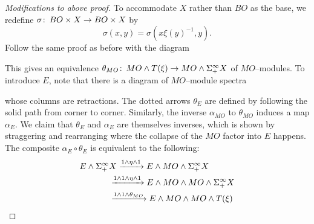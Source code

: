 \begin{proof}[Modifications to above proof]
To accommodate \(X\) rather than \(BO\) as the base, we redefine \(\sigma\colon\thinspace BO \times X \to BO \times X\) by \[\sigma(x, y) = \sigma(x \xi(y)^{-1}, y).\]  Follow the same proof as before with the diagram
\begin{center}
\end{center}
This gives an equivalence \(\theta_{MO}\colon\thinspace MO \wedge T(\xi) \rightarrow MO \wedge \Sigma^\infty_+ X\) of \(MO\)--modules.  To introduce \(E\), note that there is a diagram of \(MO\)--module spectra
\begin{center}
\end{center}
whose columns are retractions.  The dotted arrows \(\theta_E\) are defined by following the solid path from corner to corner.  Similarly, the inverse \(\alpha_{MO}\) to \(\theta_{MO}\) induces a map \(\alpha_E\).  We claim that \(\theta_E\) and \(\alpha_E\) are themselves inverses, which is shown by straggering and rearranging where the collapse of the \(MO\) factor into \(E\) happens.  The composite \(\alpha_E \circ \theta_E\) is equivalent to the following:
\begin{align*}
E \sm \Susp^\infty_+ & X \xrightarrow{1 \sm \eta \sm 1} E \sm MO \sm \Susp^\infty_+ X \\
& \xrightarrow{1 \sm 1 \sm \eta \sm 1} E \sm MO \sm MO \sm \Susp^\infty_+ X \\
& \xrightarrow{1 \sm 1 \sm \theta_{MO}} E \sm MO \sm MO \sm T(\xi) \\

\end{align*}
\end{proof}
